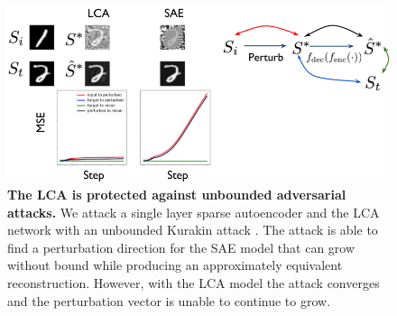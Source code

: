 \begin{figure}
    \centering
    \includegraphics[width=\textwidth]{figures/lca_sae_unbounded_attack.png}
    \caption{\textbf{The LCA is protected against unbounded adversarial attacks.} We attack a single layer sparse autoencoder and the LCA network with an unbounded Kurakin attack \parencite{kurakin2016adversarial}. The attack is able to find a perturbation direction for the SAE model that can grow without bound while producing an approximately equivalent reconstruction. However, with the LCA model the attack converges and the perturbation vector is unable to continue to grow.}
    \label{fig:ch4_lca_sae_unbounded_attack}
\end{figure}





